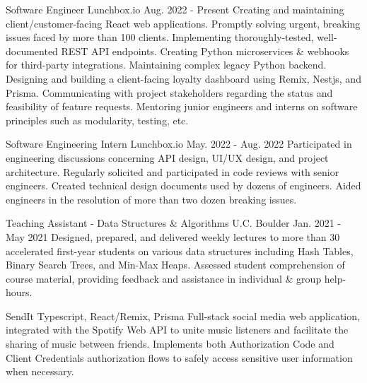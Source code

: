 \begin{divider}
  \begin{pridepoint}
    {Software Engineer}
    {Lunchbox.io}
    {Aug. 2022 - Present}
    \li Creating and maintaining client/customer-facing React web applications.
    \li Promptly solving urgent, breaking issues faced by more than 100 clients.
    \li Implementing thoroughly-tested, well-documented REST API endpoints.
    \li Creating Python microservices \& webhooks for third-party integrations.
    \li Maintaining complex legacy Python backend. 
    \li Designing and building a client-facing loyalty dashboard using Remix, Nestjs, and Prisma.
    \li Communicating with project stakeholders regarding the status and feasibility of feature requests.
    \li Mentoring junior engineers and interns on software principles such as modularity, testing, etc.
  \end{pridepoint}
  \begin{pridepoint}
    {Software Engineering Intern}
    {Lunchbox.io}
    {May. 2022 - Aug. 2022}
    \li Participated in engineering discussions concerning API design, UI/UX design, and project architecture.
    \li Regularly solicited and participated in code reviews with senior engineers.
    \li Created technical design documents used by dozens of engineers. %
    \li Aided engineers in the resolution of more than two dozen breaking issues.%
  \end{pridepoint}
  \begin{pridepoint}
    {Teaching Assistant - Data Structures \& Algorithms}
    {U.C. Boulder}
    {Jan. 2021 - May 2021}
    \li Designed, prepared, and delivered weekly lectures to more than 30 accelerated first-year students on various data structures including Hash Tables, Binary Search Trees, and Min-Max Heaps. %
    \li Assessed student comprehension of course material, providing feedback and assistance in individual \& group help-hours.
  \end{pridepoint}
\end{divider}
\begin{divider}[Projects]
  \begin{pridepoint}
    {SendIt}
    {Typescript, React/Remix, Prisma}
    {}
    \li Full-stack social media web application, integrated with the Spotify Web API to unite music listeners and facilitate the sharing of music between friends.
    \li Implements both Authorization Code and Client Credentials authorization flows to safely access sensitive user information when necessary.
  \end{pridepoint}
\end{divider}
